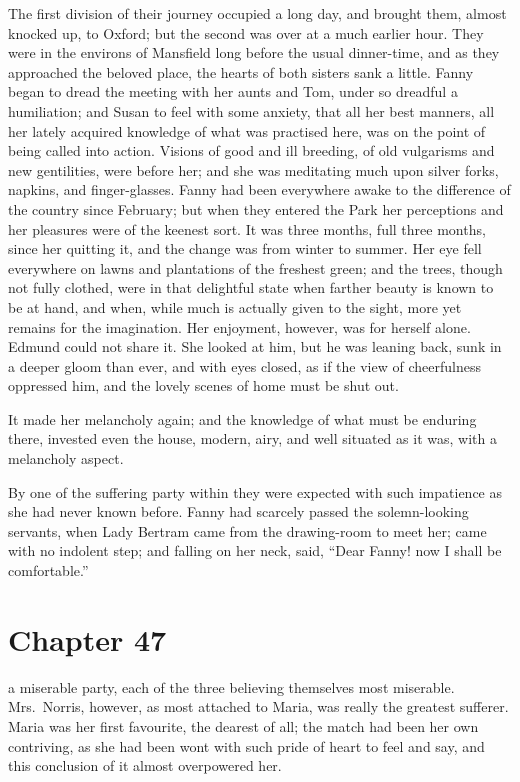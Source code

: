 The first division of their journey occupied a long day,
and brought them, almost knocked up, to Oxford;
but the second was over at a much earlier hour.
They were in the environs of Mansfield long before
the usual dinner-time, and as they approached the
beloved place, the hearts of both sisters sank a little.
Fanny began to dread the meeting with her aunts and Tom,
under so dreadful a humiliation; and Susan to feel with
some anxiety, that all her best manners, all her lately
acquired knowledge of what was practised here, was on
the point of being called into action.  Visions of good
and ill breeding, of old vulgarisms and new gentilities,
were before her; and she was meditating much upon
silver forks, napkins, and finger-glasses. Fanny had
been everywhere awake to the difference of the country
since February; but when they entered the Park her
perceptions and her pleasures were of the keenest sort.
It was three months, full three months, since her
quitting it, and the change was from winter to summer.
Her eye fell everywhere on lawns and plantations of the
freshest green; and the trees, though not fully clothed,
were in that delightful state when farther beauty is known
to be at hand, and when, while much is actually given
to the sight, more yet remains for the imagination.
Her enjoyment, however, was for herself alone.  Edmund could
not share it.  She looked at him, but he was leaning back,
sunk in a deeper gloom than ever, and with eyes closed,
as if the view of cheerfulness oppressed him, and the
lovely scenes of home must be shut out.

It made her melancholy again; and the knowledge of what must
be enduring there, invested even the house, modern, airy,
and well situated as it was, with a melancholy aspect.

By one of the suffering party within they were expected
with such impatience as she had never known before.
Fanny had scarcely passed the solemn-looking servants,
when Lady Bertram came from the drawing-room to meet her;
came with no indolent step; and falling on her neck, said,
``Dear Fanny! now I shall be comfortable.''



\chapter{Chapter 47}

 a miserable party, each of the three believing
themselves most miserable.  Mrs.\ Norris, however, as most
attached to Maria, was really the greatest sufferer.
Maria was her first favourite, the dearest of all;
the match had been her own contriving, as she had been
wont with such pride of heart to feel and say, and this
conclusion of it almost overpowered her.


